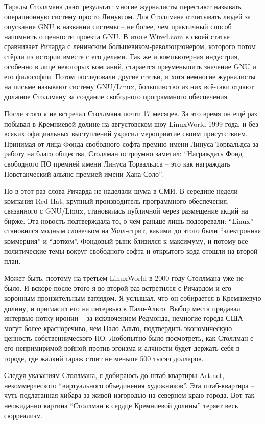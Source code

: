 Тирады Столлмана дают результат: многие журналисты перестают называть операционную систему просто Линуксом. Для Столлмана отчитывать людей за опускание GNU в названии системы  -- не более, чем практичный способ напомнить о ценности проекта GNU. В итоге Wired.com в своей статье сравнивает Ричарда с ленинским большевиком-революционером, которого потом стёрли из истории вместе с его делами. Так же и компьютерная индустрия, особенно в лице некоторых компаний, старается преуменьшить значение GNU и его философии. Потом последовали другие статьи, и хотя немногие журналисты на письме называют систему GNU/Linux, большинство из них всё-таки отдают должное Столлману за создание свободного программного обеспечения.

После этого я не встречал Столлмана почти 17 месяцев. За это время он ещё раз побывал в Кремниевой долине на августовском шоу LinuxWorld 1999 года, и без всяких официальных выступлений украсил мероприятие своим присутствием. Принимая от лица Фонда свободного софта премию имени Линуса Торвальдса за работу на благо общества, Столлман остроумно заметил: \enquote{Награждать Фонд свободного ПО премией имени Линуса Торвальдса -- это как награждать Повстанческий альянс премией имени Хана Соло}.

Но в этот раз слова Ричарда не наделали шума в СМИ. В середине недели компания Red Hat, крупный производитель программного обеспечения, связанного с GNU/Linux, становилась публичной через размещение акций на бирже. Эта новость подтверждала то, о чём раньше лишь подозревали: \enquote{Linux} становился модным словечком на Уолл-стрит, какими до этого были \enquote{электронная коммерция} и \enquote{дотком}. Фондовый рынк близился к максимуму, и потому все политические темы вокруг свободного софта и открытого кода отошли на второй план.

Может быть, поэтому на третьем LinuxWorld в 2000 году Столлмана уже не было. И вскоре после этого я во второй раз встретился с Ричардом и его коронным пронзительным взглядом. Я услышал, что он собирается в Кремниевую долину, и пригласил его на интервью в Пало-Альто. Выбор места придавал интервью нотку иронии -- за исключением Редмонда, немногие города США могут более красноречиво, чем Пало-Альто, подтвердить экономическую ценность собственнического ПО. Любопытно было посмотреть, как Столлман с его непримиримой войной против эгоизма и алчности будет держать себя в городе, где жалкий гараж стоит не меньше 500 тысяч долларов.

Следуя указаниям Столлмана, я добираюсь до штаб-квартиры Art.net, некоммерческого \enquote{виртуального объединения художников}. Эта штаб-квартира -- чуть подлатанная хибара за живой изгородью на северном краю города. Вот так неожиданно картина \enquote{Столлман в сердце Кремниевой долины} теряет весь сюрреализм.

